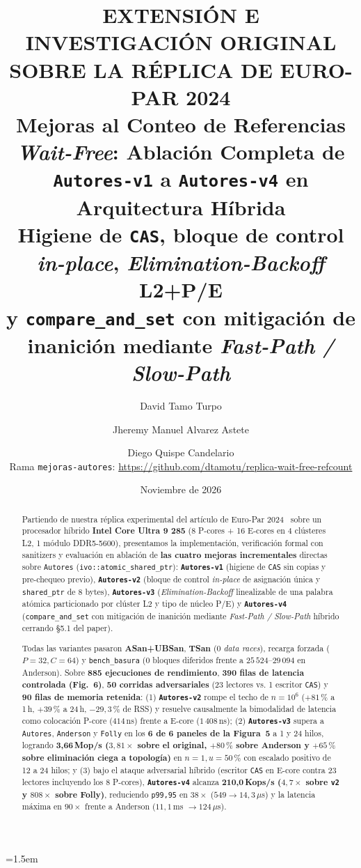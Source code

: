 \documentclass[11pt,a4paper]{article}
\title{%
  {\small\color{acento}\textbf{EXTENSIÓN E INVESTIGACIÓN ORIGINAL SOBRE LA RÉPLICA DE EURO-PAR 2024}}\\[4pt]
  \textbf{\LARGE Mejoras al Conteo de Referencias \emph{Wait-Free}: Ablación Completa de \texttt{Autores-v1} a \texttt{Autores-v4} en Arquitectura Híbrida}\\[6pt]
  {\large Higiene de \texttt{CAS}, bloque de control \emph{in-place}, \emph{Elimination-Backoff} L2+P/E\\
  y \texttt{compare\_and\_set} con mitigación de inanición mediante \emph{Fast-Path / Slow-Path}}
}
\author{%
  David Tamo Turpo \and Jheremy Manuel Alvarez Astete \and Diego Quispe Candelario\\[4pt]
  {\small Rama \texttt{mejoras-autores}: \url{https://github.com/dtamotu/replica-wait-free-refcount}}
}
\date{Noviembre de 2026}
\begin{document}
\emergencystretch=1.5em
\maketitle

\begin{abstract}
\noindent
Partiendo de nuestra réplica experimental del artículo de Euro-Par 2024~\cite{dewolff2024waitfree,dewolff2024artifact} sobre un procesador híbrido \textbf{Intel Core Ultra 9 285} (8 P-cores + 16 E-cores en 4 clústeres L2, 1 módulo DDR5-5600), presentamos la implementación, verificación formal con sanitizers y evaluación en ablación de \textbf{las cuatro mejoras incrementales} directas sobre \texttt{Autores} (\texttt{ivo::atomic\_shared\_ptr}): \textbf{\texttt{Autores-v1}} (higiene de \texttt{CAS} sin copias y pre-chequeo previo), \textbf{\texttt{Autores-v2}} (bloque de control \emph{in-place} de asignación única y \texttt{shared\_ptr} de 8 bytes), \textbf{\texttt{Autores-v3}} (\emph{Elimination-Backoff} linealizable de una palabra atómica particionado por clúster L2 y tipo de núcleo P/E) y \textbf{\texttt{Autores-v4}} (\texttt{compare\_and\_set} con mitigación de inanición mediante \emph{Fast-Path / Slow-Path} híbrido cerrando \S 5.1 del paper).

Todas las variantes pasaron \textbf{ASan+UBSan}, \textbf{TSan} (0 \emph{data races}), recarga forzada ($P=32, C=64$) y \texttt{bench\_basura} (0 bloques diferidos frente a $25\,524\text{--}29\,094$ en Anderson). Sobre \textbf{885 ejecuciones de rendimiento}, \textbf{390 filas de latencia controlada (Fig.~6)}, \textbf{50 corridas adversariales} (23 lectores vs. 1 escritor \texttt{CAS}) y \textbf{90 filas de memoria retenida}: (1) \textbf{\texttt{Autores-v2}} rompe el techo de $n=10^6$ ($+81\,\%$ a 1\,h, $+39\,\%$ a 24\,h, $-29{,}3\,\%$ de RSS) y resuelve causalmente la bimodalidad de latencia como colocación P-core ($414$\,ns) frente a E-core ($1\,408$\,ns); (2) \textbf{\texttt{Autores-v3}} supera a \texttt{Autores}, \texttt{Anderson} y \texttt{Folly} en los \textbf{6 de 6 paneles de la Figura~5} a 1 y 24 hilos, logrando \textbf{3{,}66\,Mop/s ($3{,}81\times$ sobre el original, $+80\,\%$ sobre Anderson y $+65\,\%$ sobre eliminación ciega a topología)} en $n=1, u=50\,\%$ con escalado positivo de 12 a 24 hilos; y (3) bajo el ataque adversarial híbrido (escritor \texttt{CAS} en E-core contra 23 lectores incluyendo los 8 P-cores), \textbf{\texttt{Autores-v4}} alcanza \textbf{210{,}0\,Kops/s ($4{,}7\times$ sobre \texttt{v2} y $808\times$ sobre Folly)}, reduciendo \texttt{p99,95} en \textbf{$38\times$} ($549 \to 14{,}3\,\mu$s) y la latencia máxima en \textbf{$90\times$} frente a Anderson ($11{,}1\,$ms $\to 124\,\mu$s).
\end{abstract}
\end{document}
